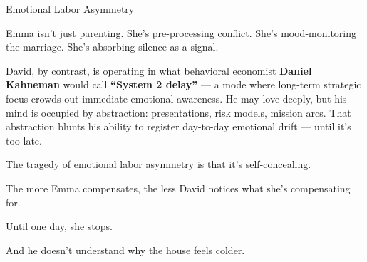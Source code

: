 \begin{PsychologicalSidebar}{Emotional Labor Asymmetry}
    \medskip
    
    Emma isn’t just parenting. She’s pre-processing conflict.  
    She’s mood-monitoring the marriage.  
    She’s absorbing silence as a signal.
    
    \medskip
    
    David, by contrast, is operating in what behavioral economist \textbf{Daniel Kahneman} would call 
    \textbf{“System 2 delay”} — a mode where long-term strategic focus crowds out immediate emotional 
    awareness. He may love deeply, but his mind is occupied by abstraction: presentations, risk models, 
    mission arcs. That abstraction blunts his ability to register day-to-day emotional drift — until 
    it's too late.
    
    \medskip
    
    The tragedy of emotional labor asymmetry is that it’s self-concealing.

    \medskip
    
    The more Emma compensates, the less David notices what she's compensating for.

    \medskip
    
    Until one day, she stops.

    \medskip
    
    And he doesn’t understand why the house feels colder.
    
\end{PsychologicalSidebar}
   
